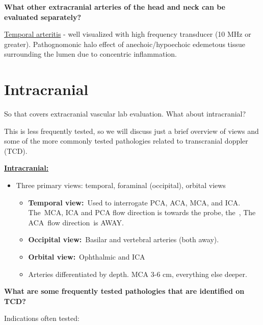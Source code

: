 \documentclass[
]{book}
\begin{document}
\textbf{What other extracranial arteries of the head and neck can be evaluated
separately?}

\uline{Temporal arteritis} - well visualized with high frequency
transducer (10 MHz or greater). Pathognomonic halo effect of
anechoic/hypoechoic edemetous tissue surrounding the lumen due to
concentric inflammation.\citep{ball2010, schmidt2014}

\hypertarget{intracranial}{%
\section{Intracranial}\label{intracranial}}

So that covers extracranial vascular lab evaluation. What about
intracranial?

This is less frequently tested, so we will discuss just a brief overview
of views and some of the more commonly tested pathologies related to
transcranial doppler (TCD).

\uline{\textbf{Intracranial:}}

\begin{itemize}
\item
  Three primary views: temporal, foraminal (occipital), orbital views

  \begin{itemize}
  \item
    \textbf{Temporal view:}~Used to interrogate PCA, ACA, MCA, and ICA.
    The~MCA, ICA and PCA flow direction is towards the probe, the~,
    The ACA~flow direction~is AWAY.
  \item
    \textbf{Occipital view:}~Basilar and vertebral arteries (both away).
  \item
    \textbf{Orbital view:}~Ophthalmic and ICA
  \item
    Arteries differentiated by depth. MCA 3-6 cm, everything else
    deeper.
  \end{itemize}
\end{itemize}

\textbf{What are some frequently tested pathologies that are identified on
TCD?}

Indications often tested:
\end{document}
